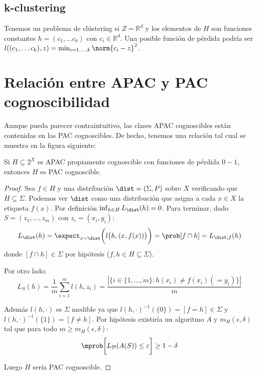 \subsection{k-clustering}
Tenemos un problema de clústering si $Z=\mathbb{R}^d$ y los elementos de $H$ son funciones constantes 
$h = (c_1, \ldots c_k)$ con $c_i \in \mathbb{R}^d$. Una posible función de pérdida podría ser 
$l((c_1, \ldots c_k), z) = \min_{i=1,\ldots, k} \norm{c_i - z}^2$.


\section{Relación entre APAC y PAC cognoscibilidad}
Aunque pueda parecer contraintuitivo, las clases APAC cognoscibles están contenidas en las PAC cognoscibles. De hecho, 
tenemos una relación tal cual se muestra en la figura siguiente:


\begin{fact}
 Si $H\subseteq 2^X$ es APAC propiamente cognoscible con funciones de pérdida $0-1$, entonces $H$ es PAC cognoscible.
 \label{fact:rel-pac-apac}
\end{fact}

  \begin{proof}
   Sea $f\in H$ y una distribución $\dist=(\Sigma,P)$ sobre $X$ verificando que $H\subseteq \Sigma$. Podemos ver 
   $\dist$ como una distribución que asigna a cada $x\in X$ la etiqueta $f(x)$. Por definición $\inf_{h\in H} L_{\dist}(h) = 0$. 
   Para terminar, dado $S=(z_1, \ldots, z_m)$ con $z_i = (x_i,y_i)$:
   \[
     L_{\dist}(h) = \expect_{x\sim \dist}\bigg(l \big(h,(x,f(x)) \big)\bigg) = \prob[f \cap h] = L_{\dist,f}(h)
   \]
   donde $[f\cap h] \in \Sigma$ por hipótesis ($f,h\in H \subseteq \Sigma$).
   
   Por otro lado:
   \[
     L_{S}(h) = \frac{1}{m} \sum_{i=1}^m l(h,z_i) = \frac{|\{i\in\{1,\ldots, m\}: h(x_i) \neq f(x_i)(= y_i)\}|}{m}
   \]
   
   Además $l(h,\cdot)$ es $\Sigma$ medible ya que $l(h, \cdot)^{-1}(\{0\}) = [f = h] \in \Sigma$ y 
   $l(h, \cdot)^{-1}(\{1\}) = [f\neq h]$. Por hipótesis existiría un algoritmo $A$ y $m_H(\epsilon, \delta)$
   tal que para todo $m\ge m_H(\epsilon, \delta)$:
   \[
     \mprob \bigg[L_{\mathcal{D}}(A(S)) \le \varepsilon \bigg] \ge 1-\delta
   \]
   
   Luego $H$ sería PAC cognoscible.
  \end{proof}